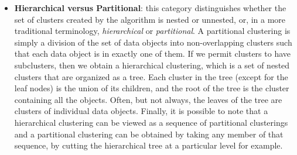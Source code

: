 \documentclass[12pt,a4paper,cucitura]{toptesi}
\begin{document}
\begin{itemize}
\item \textbf{Hierarchical versus Partitional}: this category distinguishes whether the set of clusters created by the algorithm is nested or unnested, or, in a more traditional terminology, \emph{hierarchical} or \emph{partitional}.
A partitional clustering is simply a division of the set of data objects into non-overlapping clusters such that each data object is in exactly one
of them.
If we permit clusters to have subclusters, then we obtain a hierarchical clustering, which is a set of nested clusters that are organized as a tree.
Each cluster in the tree (except for the leaf nodes) is the union of its children, and the root of the tree is the cluster containing all the objects.
Often, but not always, the leaves of the tree are clusters of individual data objects. Finally, it is possible to note that a hierarchical clustering can be viewed as a sequence of partitional clusterings and a partitional clustering can be obtained by taking any member of that sequence, by cutting the hierarchical tree at a particular level for example.

\begin{figure}
{}
\end{figure}


\end{itemize}
\end{document}

